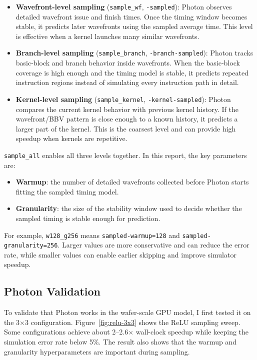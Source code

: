 \documentclass[11pt]{article}
\begin{document}
\begin{itemize}
  \item \textbf{Wavefront-level sampling} (\texttt{sample\_wf},
        \texttt{-sampled}): Photon observes detailed wavefront issue and finish
        times. Once the timing window becomes stable, it predicts later
        wavefronts using the sampled average time. This level is effective when
        a kernel launches many similar wavefronts.
  \item \textbf{Branch-level sampling} (\texttt{sample\_branch},
        \texttt{-branch-sampled}): Photon tracks basic-block and branch
        behavior inside wavefronts. When the basic-block coverage is high enough
        and the timing model is stable, it predicts repeated instruction
        regions instead of simulating every instruction path in detail.
  \item \textbf{Kernel-level sampling} (\texttt{sample\_kernel},
        \texttt{-kernel-sampled}): Photon compares the current kernel behavior
        with previous kernel history. If the wavefront/BBV pattern is close
        enough to a known history, it predicts a larger part of the kernel. This
        is the coarsest level and can provide high speedup when kernels are
        repetitive.
\end{itemize}

\texttt{sample\_all} enables all three levels together. In this report, the key
parameters are:

\begin{itemize}
  \item \textbf{Warmup}: the number of detailed wavefronts collected before
        Photon starts fitting the sampled timing model.
  \item \textbf{Granularity}: the size of the stability window used to decide
        whether the sampled timing is stable enough for prediction.
\end{itemize}

For example, \texttt{w128\_g256} means \texttt{sampled-warmup=128} and
\texttt{sampled-granularity=256}. Larger values are more conservative and can
reduce the error rate, while smaller values can enable earlier skipping and
improve simulator speedup.

\subsection{Photon Validation}
To validate that Photon works in the wafer-scale GPU model, I first tested it
on the 3$\times$3 configuration. Figure~\ref{fig:relu-3x3} shows the ReLU
sampling sweep. Some configurations achieve about 2--2.6$\times$ wall-clock
speedup while keeping the simulation error rate below 5\%.
The result also shows that the warmup and granularity hyperparameters are
important during sampling.
\end{document}
